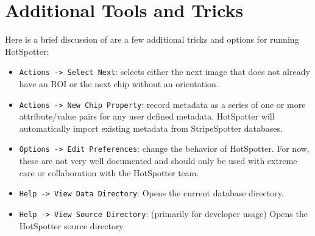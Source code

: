 \documentclass[a4paper,10pt]{article}
\begin{document}
\section{Additional Tools and Tricks}

Here is a brief discussion of are a few additional tricks and options
for running HotSpotter:
\begin{itemize}
\item \verb+Actions -> Select Next+:
    selects either the next image that does not already have an ROI or the next chip without an
    orientation. 

\item \verb+Actions -> New Chip Property+:  
    record metadata as a series of one or more attribute/value pairs for any
    user defined metadata.  HotSpotter will automatically import existing
    metadata from StripeSpotter databases.



\item \verb+Options -> Edit Preferences+: 
    change the behavior of HotSpotter. For now, these are not very well
    documented and should only be used with extreme care or collaboration with
    the HotSpotter team.




\item \verb+Help -> View Data Directory+: 
    Opens the current database directory.

\item \verb+Help -> View Source Directory+: (primarily for developer usage)
    Opens the HotSpotter source directory. 


\end{itemize}
\end{document}
